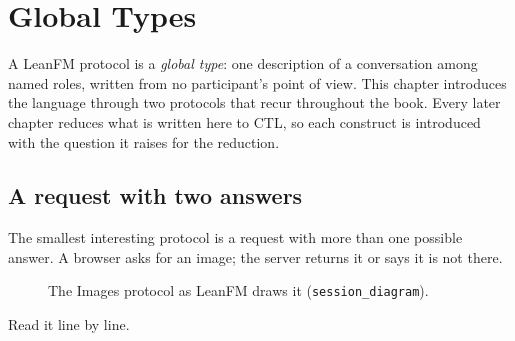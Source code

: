 \chapter{Global Types}\label{ch:global}

A LeanFM protocol is a \emph{global type}: one description of a conversation among
named roles, written from no participant's point of view. This chapter introduces the
language through two protocols that recur throughout the book. Every later chapter
reduces what is written here to CTL, so each construct is introduced with the question
it raises for the reduction.

\section{A request with two answers}

The smallest interesting protocol is a request with more than one possible answer.
A browser asks for an image; the server returns it or says it is not there.



\begin{figure}[ht]
\centering
{}
\caption{The Images protocol as LeanFM draws it (\texttt{session\_diagram}).}
\label{fig:images}
\end{figure}

Read it line by line.

